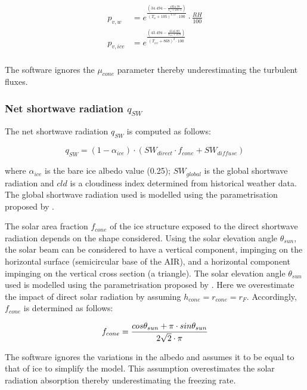 \documentclass[utf8]{frontiersSCNS}
\begin{document}
\begin{equation}
	\begin{split}
		p_{v,w}&=e^{\frac{(34.494 - \frac{4924.99}{T_{a} + 237.1})}{(T_a + 105)^{1.57} \cdot 100}} \cdot \frac{RH}{100} \\
		p_{v,ice}&=e^{\frac{(43.494 - \frac{6545.89}{T_{ice} + 278})}{(T_{ice} + 868)^{2} \cdot 100}} \\
	\end{split} \label{eqn:vp}
\end{equation}

The software ignores the $\mu_{cone}$ parameter thereby underestimating the turbulent fluxes.

\subsubsection{Net shortwave radiation \texorpdfstring{$q_{SW}$}{Lg}}
\label{sec:SW}

The net shortwave radiation $q_{SW}$ is computed as follows:

\begin{equation} q_{SW} = (1- \alpha_{ice}) \cdot ( SW_{direct} \cdot f_{cone} + SW_{diffuse})
\label{eqn:SW} \end{equation}

where $\alpha_{ice}$ is the bare ice albedo value (0.25); $SW_{global}$ is the global shortwave radiation and
$cld$ is a cloudiness index determined from historical weather data. The global shortwave radiation used is
modelled using the parametrisation proposed by \cite{Woolf_1968}.

The solar area fraction $f_{cone}$ of the ice structure exposed to the direct shortwave radiation depends on the
shape considered. Using the solar elevation angle $\theta_{sun}$, the solar beam can be considered to have a
vertical component, impinging on the horizontal surface (semicircular base of the AIR), and a horizontal
component impinging on the vertical cross section (a triangle). The solar elevation angle $\theta_{sun}$ used is
modelled using the parametrisation proposed by \cite{Woolf_1968}. Here we overestimate the impact of direct
solar radiation by assuming $h_{cone} = r_{cone} = r_{F}$. Accordingly, $f_{cone}$ is determined as follows:

\begin{equation}
	\begin{split}
		f_{cone}& =\frac{ cos \theta_{sun} + \pi \cdot sin \theta_{sun} }{2\sqrt{2} \cdot \pi }\\
	\end{split}
	\label{ eqn:f_{cone}}
\end{equation}

The software ignores the variations in the albedo and assumes it to be equal to that of ice to simplify the
model. This assumption overestimates the solar radiation absorption thereby underestimating the freezing rate.

 
\end{document}
